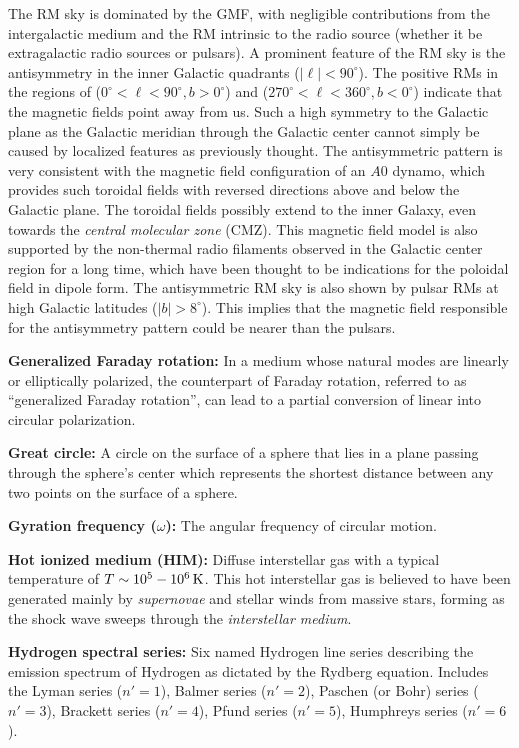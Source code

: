 \documentclass[a4paper,10pt]{article}
\begin{document}
{\noindent}The RM sky is dominated by the GMF, with negligible contributions from the intergalactic medium and the RM intrinsic to the radio source (whether it be extragalactic radio sources or pulsars). A prominent feature of the RM sky is the antisymmetry in the inner Galactic quadrants ($|\ell|<90^\circ$). The positive RMs in the regions of ($0^\circ<\ell<90^\circ, b>0^\circ$) and ($270^\circ<\ell<360^\circ, b<0^\circ$) indicate that the magnetic fields point away from us. Such a high symmetry to the Galactic plane as the Galactic meridian through the Galactic center cannot simply be caused by localized features as previously thought. The antisymmetric pattern is very consistent with the magnetic field configuration of an $A0$ dynamo, which provides such toroidal fields with reversed directions above and below the Galactic plane. The toroidal fields possibly extend to the inner Galaxy, even towards the \textit{central molecular zone} (CMZ). This magnetic field model is also supported by the non-thermal radio filaments observed in the Galactic center region for a long time, which have been thought to be indications for the poloidal field in dipole form. The antisymmetric RM sky is also shown by pulsar RMs at high Galactic latitudes ($|b|>8^\circ$). This implies that the magnetic field responsible for the antisymmetry pattern could be nearer than the pulsars. 

{\noindent}\textbf{Generalized Faraday rotation:} In a medium whose natural modes are linearly or elliptically polarized, the counterpart of Faraday rotation, referred to as ``generalized Faraday rotation'', can lead to a partial conversion of linear into circular polarization.

{\noindent}\textbf{Great circle:} A circle on the surface of a sphere that lies in a plane passing through the sphere's center which represents the shortest distance between any two points on the surface of a sphere.

{\noindent}\textbf{Gyration frequency ($\omega$):} The angular frequency of circular motion.

{\noindent}\textbf{Hot ionized medium (HIM):} Diffuse interstellar gas with a typical temperature of $T\sim10^5-10^6\,{\rm K}$. This hot interstellar gas is believed to have been generated mainly by \textit{supernovae} and stellar winds from massive stars, forming as the shock wave sweeps through the \textit{interstellar medium}.

{\noindent}\textbf{Hydrogen spectral series:} Six named Hydrogen line series describing the emission spectrum of Hydrogen as dictated by the Rydberg equation. Includes the Lyman series ($n'=1$), Balmer series ($n'=2$), Paschen (or Bohr) series ($n'=3$), Brackett series ($n'=4$), Pfund series ($n'=5$), Humphreys series ($n'=6$).
\end{document}
